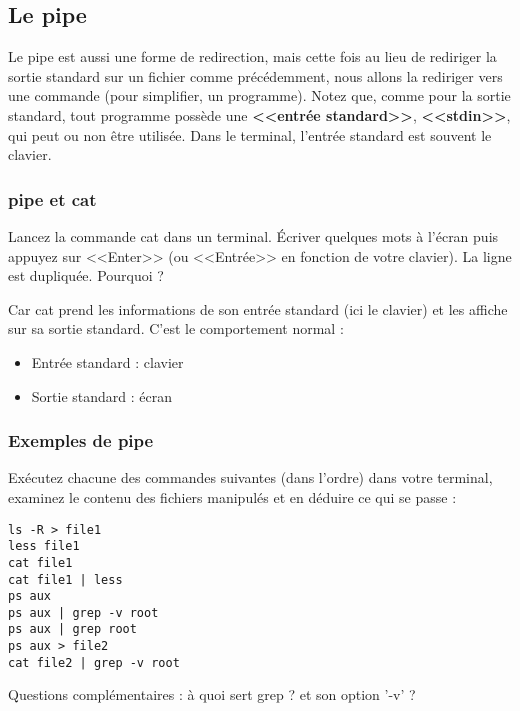 \documentclass[11pt]{article}
\begin{document}
\subsection{Le pipe}

Le pipe est aussi une forme de redirection, mais cette fois au lieu de rediriger la sortie standard
sur un fichier comme précédemment, nous allons la rediriger vers une commande (pour simplifier, un
programme). Notez que, comme pour la sortie standard, tout programme possède une \textbf{<<entrée standard>>}, \textbf{<<stdin>>}, 
qui peut ou non être utilisée. Dans le terminal, l'entrée standard est souvent le clavier.

\subsubsection{pipe et cat}

Lancez la commande cat dans un terminal.
Écriver quelques mots à l’écran puis appuyez sur <<Enter>> (ou <<Entrée>> en fonction de votre clavier).
La ligne est dupliquée. Pourquoi ?

\begin{solution}
 Car cat prend les informations de son entrée standard (ici le clavier) et les affiche sur sa sortie standard.
 C’est le comportement normal :
 \begin{itemize}
  \item Entrée standard : clavier
  \item Sortie standard : écran
 \end{itemize}
\end{solution}

\subsubsection{Exemples de pipe}

Exécutez chacune des commandes suivantes (dans l’ordre) dans votre terminal, examinez le contenu des fichiers manipulés et en déduire ce qui se passe :

\begin{lstlisting}
ls -R > file1
less file1
cat file1
cat file1 | less
ps aux
ps aux | grep -v root
ps aux | grep root
ps aux > file2
cat file2 | grep -v root
\end{lstlisting}

Questions complémentaires : à quoi sert grep ? et son option '-v' ?
\end{document}
